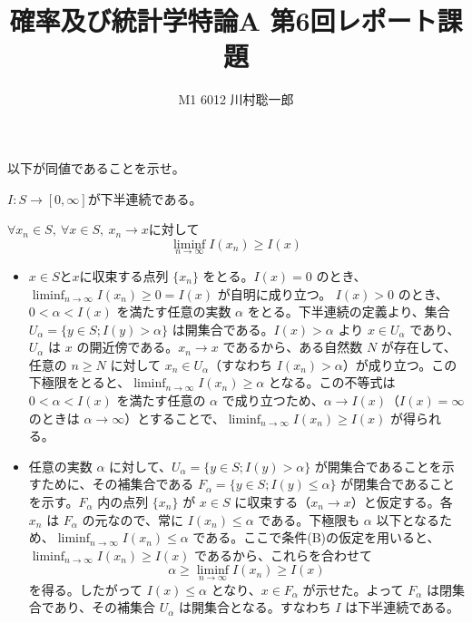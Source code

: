 \documentclass[dvipdfmx]{jsreport}
\title{確率及び統計学特論A 第6回レポート課題}
\author{M1 6012 川村聡一郎}
\date{}
\begin{document}
\maketitle

\begin{tcolorbox}
	以下が同値であることを示せ。
\begin{enumerate_Alpha}
	\item $I\colon S\to [0, \infty]$が下半連続である。
	\item $\forall x_n\in S,\ \forall x\in S,\ x_n\to x$に対して
\begin{equation*}
	\liminf_{n\to \infty} I(x_n)\ge I(x)
\end{equation*}
\end{enumerate_Alpha}
\end{tcolorbox}

\begin{souanswer} %
\begin{itemize}
	\item[$\Rightarrow$]
	$x\in S$と$x$に収束する点列 $\{x_n\}$ をとる。$I(x)=0$ のとき、$\liminf_{n\to\infty} I(x_n) \ge 0 = I(x)$ が自明に成り立つ。
	$I(x) > 0$ のとき、$0 < \alpha < I(x)$ を満たす任意の実数 $\alpha$ をとる。下半連続の定義より、集合 $U_\alpha = \{y \in S ; I(y) > \alpha\}$ は開集合である。$I(x) > \alpha$ より $x \in U_\alpha$ であり、$U_\alpha$ は $x$ の開近傍である。$x_n \to x$ であるから、ある自然数 $N$ が存在して、任意の $n \ge N$ に対して $x_n \in U_\alpha$（すなわち $I(x_n) > \alpha$）が成り立つ。この下極限をとると、$\liminf_{n\to\infty} I(x_n) \ge \alpha$ となる。この不等式は $0 < \alpha < I(x)$ を満たす任意の $\alpha$ で成り立つため、$\alpha \to I(x)$（$I(x)=\infty$ のときは $\alpha \to \infty$）とすることで、$\liminf_{n\to\infty} I(x_n) \ge I(x)$ が得られる。
	
	\item[$\Leftarrow$]
	任意の実数 $\alpha$ に対して、$U_\alpha = \{y \in S ; I(y) > \alpha\}$ が開集合であることを示すために、その補集合である $F_\alpha = \{y \in S ; I(y) \le \alpha\}$ が閉集合であることを示す。$F_\alpha$ 内の点列 $\{x_n\}$ が $x \in S$ に収束する（$x_n \to x$）と仮定する。各 $x_n$ は $F_\alpha$ の元なので、常に $I(x_n) \le \alpha$ である。下極限も $\alpha$ 以下となるため、$\liminf_{n\to\infty} I(x_n) \le \alpha$ である。ここで条件(B)の仮定を用いると、$\liminf_{n\to\infty} I(x_n) \ge I(x)$ であるから、これらを合わせて$$\alpha \ge \liminf_{n\to\infty} I(x_n) \ge I(x)$$を得る。したがって $I(x) \le \alpha$ となり、$x \in F_\alpha$ が示せた。よって $F_\alpha$ は閉集合であり、その補集合 $U_\alpha$ は開集合となる。すなわち $I$ は下半連続である。
\end{itemize}
\end{souanswer}
\end{document}
